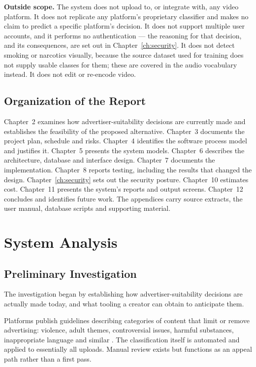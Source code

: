 \documentclass[
12pt,
a4paper,
oneside
]{report}
\begin{document}
\textbf{Outside scope.} The system does not upload to, or integrate with, any
video platform. It does not replicate any platform's proprietary classifier and
makes no claim to predict a specific platform's decision. It does not support
multiple user accounts, and it performs no authentication --- the reasoning for
that decision, and its consequences, are set out in Chapter~\ref{ch:security}.
It does not detect smoking or narcotics visually, because the source dataset
used for training does not supply usable classes for them; these are covered in
the audio vocabulary instead. It does not edit or re-encode video.

\section{Organization of the Report}

Chapter~2 examines how advertiser-suitability decisions are currently made and
establishes the feasibility of the proposed alternative. Chapter~3 documents the
project plan, schedule and risks. Chapter~4 identifies the software process
model and justifies it. Chapter~5 presents the system models. Chapter~6
describes the architecture, database and interface design. Chapter~7 documents
the implementation. Chapter~8 reports testing, including the results that
changed the design. Chapter~\ref{ch:security} sets out the security posture.
Chapter~10 estimates cost. Chapter~11 presents the system's reports and output
screens. Chapter~12 concludes and identifies future work. The appendices carry
source extracts, the user manual, database scripts and supporting material.

\chapter{System Analysis}

\section{Preliminary Investigation}

The investigation began by establishing how advertiser-suitability decisions are
actually made today, and what tooling a creator can obtain to anticipate them.

Platforms publish guidelines describing categories of content that limit or
remove advertising: violence, adult themes, controversial issues, harmful
substances, inappropriate language and similar \cite{YouTubeAdFriendly}. The
classification itself is automated and applied to essentially all uploads.
Manual review exists but functions as an appeal path rather than a first pass.
\end{document}
